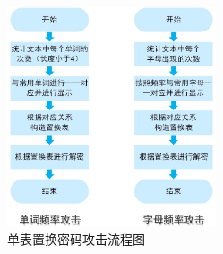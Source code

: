 \documentclass[UTF8,a4paper]{article}
\begin{document}
		\begin{figure}[!ht]
	
	\centering
	\includegraphics[width=0.55\textwidth]{secondAttack.JPG}
	\caption{单表置换密码攻击流程图}
	\label{fig:secondAttack}
\end{figure}
\end{document}
